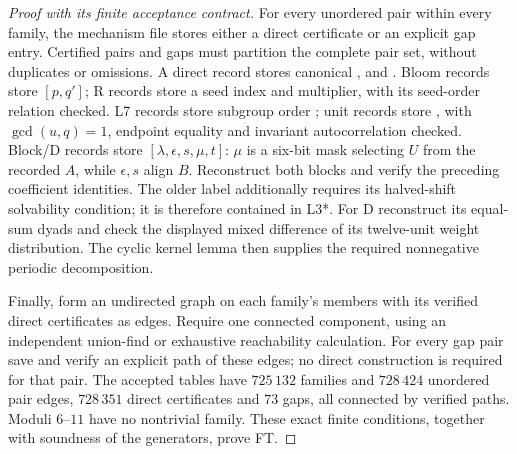 \begin{proof}[Proof with its finite acceptance contract]
For every unordered pair within every family, the mechanism file stores
either a direct certificate or an explicit gap entry. Certified pairs and
gaps must partition the complete pair set, without duplicates or omissions.
A direct record stores canonical ,  and .
Bloom records store  $[p,q']$; R records store a seed
index and multiplier, with its seed-order relation checked. L7 records
store subgroup order ; unit records store , with
$\gcd(u,q)=1$, endpoint equality and invariant autocorrelation checked.
Block/D records store  $[\lambda,\epsilon,s,\mu,t]$:
$\mu$ is a six-bit mask selecting $U$ from the recorded $A$, while
$\epsilon,s$ align $B$. Reconstruct both blocks and verify the preceding
coefficient identities. The older  label additionally requires
its halved-shift solvability condition; it is therefore contained in L3*.
For D reconstruct its equal-sum dyads and check the displayed mixed
difference of its twelve-unit weight distribution. The cyclic kernel lemma
then supplies the required nonnegative periodic decomposition.

Finally, form an undirected graph on each family's members with its
verified direct certificates as edges. Require one connected component,
using an independent union-find or exhaustive reachability calculation.
For every gap pair save and verify an explicit path of these edges; no
direct construction is required for that pair. The accepted tables have
$725\,132$ families and $728\,424$ unordered pair edges, $728\,351$
direct certificates and $73$ gaps, all connected by verified paths.
Moduli $6$--$11$ have no nontrivial family. These exact finite conditions,
together with soundness of the generators, prove FT.
\end{proof}


